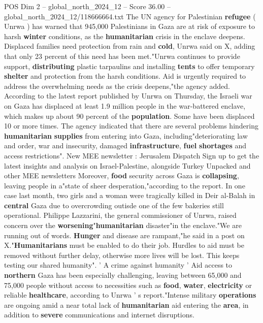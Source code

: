 \begin{textsample}{POS Dim 2 – global\_north\_2024\_12 – Score 36.00 – global\_north\_2024\_12/118666664.txt}  \label{ex:f2_pos_181}
The UN agency for Palestinian \textbf{refugee} ( Unrwa ) has warned that 945,000 Palestinians in Gaza are at risk of exposure to harsh \textbf{winter} conditions, as the \textbf{humanitarian} crisis in the enclave deepens.
Displaced families need protection from rain and \textbf{cold}, Unrwa said on X, adding that only 23 percent of this need has been met."Unrwa continues to provide support, \textbf{distributing} plastic tarpaulins and installing \textbf{tents} to offer temporary \textbf{shelter} and protection from the harsh conditions.
Aid is urgently required to address the overwhelming needs as the crisis deepens,"the agency added.
According to the latest report published by Unrwa on Thursday, the Israeli war on Gaza has displaced at least 1.9 million people in the war-battered enclave, which makes up about 90 percent of the \textbf{population}.
Some have been displaced 10 or more times.
The agency indicated that there are several problems hindering \textbf{humanitarian} \textbf{supplies} from entering into Gaza, including"deteriorating law and order, war and insecurity, damaged \textbf{infrastructure}, \textbf{fuel} \textbf{shortages} and access restrictions".
New MEE newsletter : Jerusalem Dispatch Sign up to get the latest insights and analysis on Israel-Palestine, alongside Turkey Unpacked and other MEE newsletters Moreover, \textbf{food} security across Gaza is \textbf{collapsing}, leaving people in a"state of sheer desperation,"according to the report.
In one case last month, two girls and a woman were tragically killed in Deir al-Balah in \textbf{central} Gaza due to overcrowding outisde one of the few bakeries still operational.
Philippe Lazzarini, the general commissioner of Unrwa, raised concern over the \textbf{worsening}"\textbf{humanitarian} disaster"in the enclave."We are running out of words. \textbf{Hunger} and disease are rampant,"he said in a post on X."\textbf{Humanitarians} must be enabled to do their job.
Hurdles to aid must be removed without further delay, otherwise more lives will be lost.
This keeps testing our shared humanity". ' A crime against humanity ' Aid access to \textbf{northern} Gaza has been especially challenging, leaving between 65,000 and 75,000 people without access to necessities such as \textbf{food}, \textbf{water}, \textbf{electricity} or reliable \textbf{healthcare}, according to Unrwa ' s report."Intense military \textbf{operations} are ongoing amid a near total lack of \textbf{humanitarian} aid entering the \textbf{area}, in addition to \textbf{severe} communications and internet disruptions.

\end{textsample}
